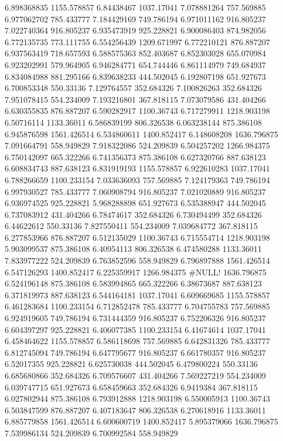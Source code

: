 6.898368835	1155.578857
6.84438467	1037.17041
7.078881264	757.569885
6.977062702	785.433777
7.184429169	749.786194
6.971011162	916.805237
7.022740364	916.805237
6.935473919	925.228821
6.900086403	874.982056
6.772135735	773.111755
6.554256439	1209.671997
6.772210121	876.887207
6.937563419	718.657593
6.588575363	852.403687
6.852303028	655.070984
6.923202991	579.964905
6.946284771	654.744446
6.861114979	749.684937
6.834084988	881.295166
6.839638233	444.502045
6.192807198	651.927673
6.700853348	550.33136
7.129764557	352.684326
7.100826263	352.684326
7.951078415	554.234009
7.193216801	367.818115
7.073079586	431.404266
6.630355835	876.887207
6.590282917	1100.36743
6.717279911	1218.903198
6.50716114	1133.36011
6.586839199	806.326538
6.063238144	875.386108
6.945876598	1561.426514
6.534860611	1400.852417
6.148608208	1636.796875
7.091664791	558.949829
7.918322086	524.209839
6.504257202	1266.984375
6.750142097	665.322266
6.741356373	875.386108
6.627320766	887.638123
6.608834743	887.638123
6.831919193	1155.578857
6.922610283	1037.17041
6.788266659	1100.233154
7.033636093	757.569885
7.124179363	749.786194
6.997930527	785.433777
7.060908794	916.805237
7.021020889	916.805237
6.936974525	925.228821
5.968288898	651.927673
6.535388947	444.502045
6.737083912	431.404266
6.78474617	352.684326
6.730494499	352.684326
6.44622612	550.33136
7.827550411	554.234009
7.039684772	367.818115
6.277853966	876.887207
6.512135029	1100.36743
6.715554714	1218.903198
5.903099537	875.386108
6.40954113	806.326538
6.474580288	1133.36011
7.833977222	524.209839
6.763852596	558.949829
6.796897888	1561.426514
6.547126293	1400.852417
6.225359917	1266.984375
#NULL!	1636.796875
6.524196148	875.386108
6.583994865	665.322266
6.38673687	887.638123
6.371819973	887.638123
6.544164181	1037.17041
6.609669685	1155.578857
6.461283684	1100.233154
6.712852478	785.433777
6.704755783	757.569885
6.924919605	749.786194
6.731444359	916.805237
6.752206326	916.805237
6.604397297	925.228821
6.406077385	1100.233154
6.41674614	1037.17041
6.458464622	1155.578857
6.586118698	757.569885
6.642831326	785.433777
6.812745094	749.786194
6.647795677	916.805237
6.661780357	916.805237
6.52017355	925.228821
6.625730038	444.502045
6.479800224	550.33136
6.685680866	352.684326
6.709576607	431.404266
7.569227219	554.234009
6.039747715	651.927673
6.658459663	352.684326
6.9419384	367.818115
6.027802944	875.386108
6.793912888	1218.903198
6.550005913	1100.36743
6.503847599	876.887207
6.407183647	806.326538
6.270618916	1133.36011
6.885779858	1561.426514
6.600600719	1400.852417
5.895379066	1636.796875
7.539986134	524.209839
6.700992584	558.949829
